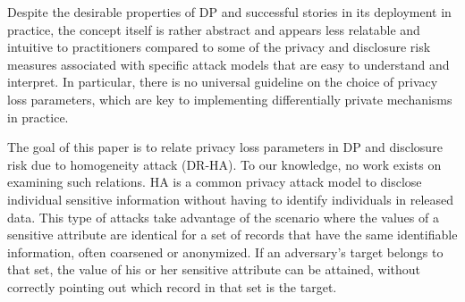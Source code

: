 \documentclass[10pt,journal,compsoc]{IEEEtran}
\begin{document}
Despite the desirable properties of DP and successful stories in its deployment in practice, the concept itself is rather abstract and appears less relatable and intuitive to practitioners compared to some of the privacy and disclosure risk measures associated with specific attack models that are easy to understand and interpret. In particular, there is no universal guideline on the choice of privacy loss parameters, which are key to implementing differentially private mechanisms in practice.  

The goal of this paper is to relate privacy loss parameters in DP and disclosure risk due to homogeneity attack (DR-HA). To our knowledge, no work exists on examining such relations.   HA is a common privacy attack model to disclose individual sensitive information without having to identify individuals in released data.  This type of attacks take advantage of the scenario where the values of a sensitive attribute are identical for a set of records that have the same identifiable information, often coarsened or anonymized. If an adversary's target belongs to that set, the value of his or her sensitive attribute can be attained, without correctly pointing out which record in that set is the target.  


\vspace{-9pt}
\end{document}
